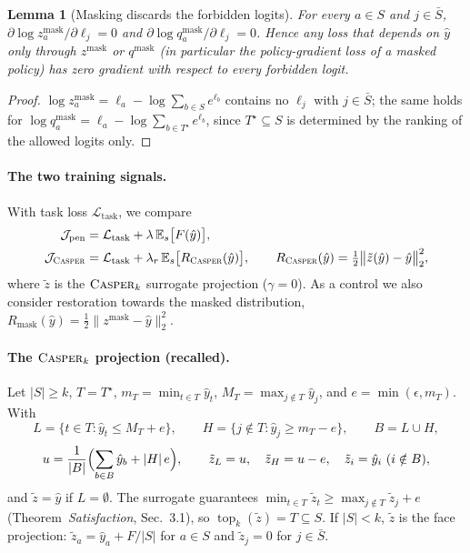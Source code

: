 \documentclass[11pt]{article}
\providecommand{\casper}{\textnormal{\textsc{Casper}}}
\DeclareMathOperator{\Topk}{top}\renewcommand{\Topk}{\operatorname{top}_k}
\newcommand{\yh}{\hat y}
\newcommand{\zt}{\tilde z}
\newcommand{\zm}{z^{\mathrm{mask}}}
\newcommand{\Sb}{\bar S}
\newcommand{\1}{\mathbf 1}
\newcommand{\Rc}{R_{\casper}}
\newcommand{\Rm}{R_{\mathrm{mask}}}
\newtheorem{lemma}[proposition]{Lemma}
\theoremstyle{definition}
\theoremstyle{remark}
\begin{document}
\begin{lemma}[Masking discards the forbidden logits]\label{lem:mask}
For every $a\in S$ and $j\in\Sb$, $\partial\log\zm_a/\partial\ell_j=0$ and
$\partial\log q^{\mathrm{mask}}_a/\partial\ell_j=0$. Hence any loss that depends on $\yh$ only
through $\zm$ or $q^{\mathrm{mask}}$ (in particular the policy-gradient loss of a masked policy) has
zero gradient with respect to every forbidden logit.
\end{lemma}
\begin{proof}
$\log\zm_a=\ell_a-\log\sum_{b\in S}e^{\ell_b}$ contains no $\ell_j$ with $j\in\Sb$; the same holds
for $\log q^{\mathrm{mask}}_a=\ell_a-\log\sum_{b\in T^\star}e^{\ell_b}$, since $T^\star\subseteq S$
is determined by the ranking of the allowed logits only.
\end{proof}

\paragraph{The two training signals.} With task loss $\mathcal L_{\mathrm{task}}$, we compare
\begin{align}
\mathcal J_{\mathrm{pen}}&=\mathcal L_{\mathrm{task}}+\lambda\,\mathbb E_s\bigl[F(\yh)\bigr],
\label{eq:pen}\\
\mathcal J_{\casper}&=\mathcal L_{\mathrm{task}}+\lambda_r\,\mathbb E_s\bigl[\Rc(\yh)\bigr],
\qquad \Rc(\yh)=\tfrac12\bigl\|\zt(\yh)-\yh\bigr\|_2^2,
\label{eq:casper}
\end{align}
where $\zt$ is the $\casper_k$ surrogate projection ($\gamma=0$). As a control we also consider
restoration towards the masked distribution, $\Rm(\yh)=\tfrac12\|\zm-\yh\|_2^2$.

\paragraph{The $\casper_k$ projection (recalled).} Let $|S|\ge k$, $T=T^\star$,
$m_T=\min_{t\in T}\yh_t$, $M_T=\max_{j\notin T}\yh_j$, and $e=\min(\epsilon,m_T)$. With
\[
L=\{t\in T:\yh_t\le M_T+e\},\qquad H=\{j\notin T:\yh_j\ge m_T-e\},\qquad B=L\cup H,
\]
\[
u=\frac{1}{|B|}\Bigl(\sum_{b\in B}\yh_b+|H|\,e\Bigr),\qquad
\zt_L=u,\quad \zt_H=u-e,\quad \zt_i=\yh_i\ (i\notin B),
\]
and $\zt=\yh$ if $L=\emptyset$. The surrogate guarantees
$\min_{t\in T}\zt_t\ge\max_{j\notin T}\zt_j+e$ (Theorem~\emph{Satisfaction}, Sec.~3.1), so
$\Topk(\zt)=T\subseteq S$. If $|S|<k$, $\zt$ is the face projection: $\zt_a=\yh_a+F/|S|$ for
$a\in S$ and $\zt_j=0$ for $j\in\Sb$.
\end{document}
